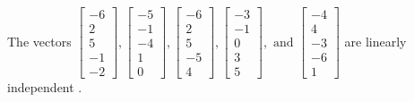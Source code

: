 \begin{exercise}
\begin{exerciseStatement}
  \end{exerciseStatement}
  \begin{exerciseAnswer}
   The vectors \(\left[\begin{array}{r}
-6 \\
2 \\
5 \\
-1 \\
-2
\end{array}\right] , \left[\begin{array}{r}
-5 \\
-1 \\
-4 \\
1 \\
0
\end{array}\right] , \left[\begin{array}{r}
-6 \\
2 \\
5 \\
-5 \\
4
\end{array}\right] , \left[\begin{array}{r}
-3 \\
-1 \\
0 \\
3 \\
5
\end{array}\right] , \text{ and } \left[\begin{array}{r}
-4 \\
4 \\
-3 \\
-6 \\
1
\end{array}\right]\) are 
  	 linearly independent  .
  


  \end{exerciseAnswer}
\end{exercise}